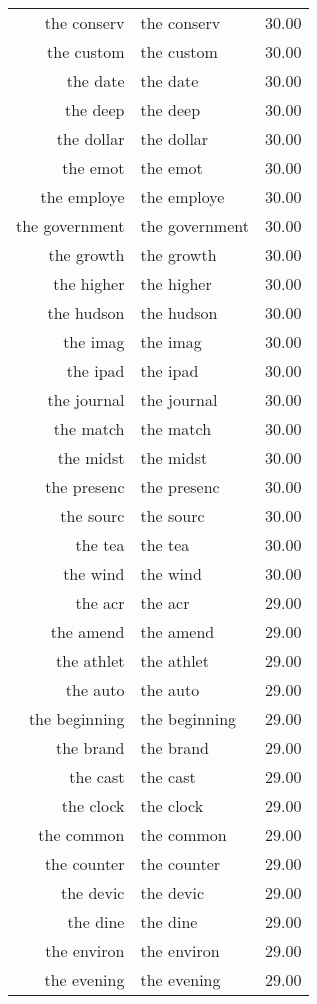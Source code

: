 \begin{table}[ht]
\begin{tabular}{rlr}
  the conserv & the conserv & 30.00 \\ 
  the custom & the custom & 30.00 \\ 
  the date & the date & 30.00 \\ 
  the deep & the deep & 30.00 \\ 
  the dollar & the dollar & 30.00 \\ 
  the emot & the emot & 30.00 \\ 
  the employe & the employe & 30.00 \\ 
  the government & the government & 30.00 \\ 
  the growth & the growth & 30.00 \\ 
  the higher & the higher & 30.00 \\ 
  the hudson & the hudson & 30.00 \\ 
  the imag & the imag & 30.00 \\ 
  the ipad & the ipad & 30.00 \\ 
  the journal & the journal & 30.00 \\ 
  the match & the match & 30.00 \\ 
  the midst & the midst & 30.00 \\ 
  the presenc & the presenc & 30.00 \\ 
  the sourc & the sourc & 30.00 \\ 
  the tea & the tea & 30.00 \\ 
  the wind & the wind & 30.00 \\ 
  the acr & the acr & 29.00 \\ 
  the amend & the amend & 29.00 \\ 
  the athlet & the athlet & 29.00 \\ 
  the auto & the auto & 29.00 \\ 
  the beginning & the beginning & 29.00 \\ 
  the brand & the brand & 29.00 \\ 
  the cast & the cast & 29.00 \\ 
  the clock & the clock & 29.00 \\ 
  the common & the common & 29.00 \\ 
  the counter & the counter & 29.00 \\ 
  the devic & the devic & 29.00 \\ 
  the dine & the dine & 29.00 \\ 
  the environ & the environ & 29.00 \\ 
  the evening & the evening & 29.00 \\ 

\end{tabular}
\end{table}
